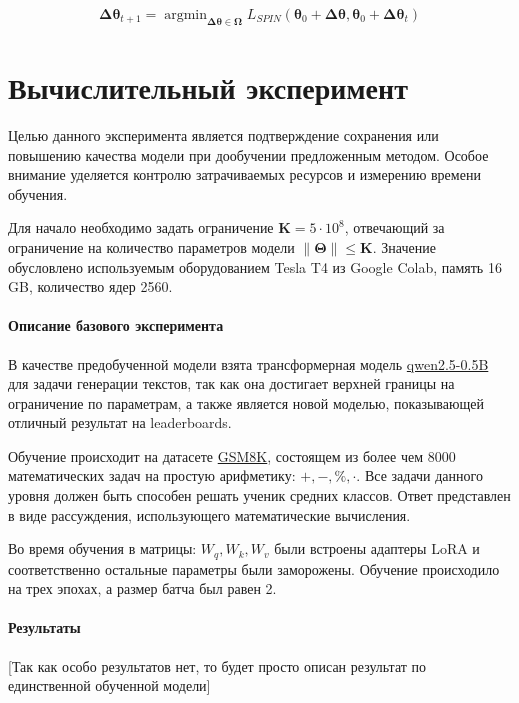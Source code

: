 \documentclass[12pt, twoside]{article}
\newcommand{\bOmega}{\boldsymbol{\Omega}}
\newcommand{\btheta}{\boldsymbol{\theta}}
\newcommand{\bTheta}{\boldsymbol{\Theta}}
\newcommand{\bDelta}{\boldsymbol{\Delta}}
\newcommand{\argmin}{\mathop{\mathrm{argmin}}}
\begin{document}
\begin{align}
    \bDelta\btheta_{t+1} = \argmin_{\bDelta\btheta \in \bOmega} L_{SPIN} (\btheta_0 + \bDelta\btheta, \btheta_0 + \bDelta \btheta_t)
\end{align}

\section{Вычислительный эксперимент}

Целью данного эксперимента является подтверждение сохранения или повышению качества модели при дообучении предложенным методом. Особое внимание уделяется контролю затрачиваемых ресурсов и измерению времени обучения.

Для начало необходимо задать ограничение $\mathbf{K} = 5\cdot10^8$, отвечающий за ограничение на количество параметров модели $\| \bTheta\| \le \mathbf{K}$. Значение обусловлено используемым оборудованием Tesla T4 из Google Colab, память 16 GB, количество ядер 2560. 

\paragraph{Описание базового эксперимента}
В качестве предобученной модели взята трансформерная модель \href{https://huggingface.co/Qwen/Qwen2.5-0.5B}{qwen2.5-0.5B} для задачи генерации текстов, так как она достигает верхней границы на ограничение по параметрам, а также является новой моделью, показывающей отличный результат на leaderboards.

Обучение происходит на датасете \href{https://huggingface.co/datasets/openai/gsm8k}{GSM8K}, состоящем из более чем 8000 математических задач на простую арифметику: $+, -, \%, \cdot$. Все задачи данного уровня должен быть способен решать ученик средних классов. Ответ представлен в виде рассуждения, использующего математические вычисления.

Во время обучения в матрицы:  $W_q, W_k, W_v$ были встроены адаптеры LoRA и соответственно остальные параметры были заморожены. Обучение происходило на трех эпохах, а размер батча был равен 2.

\paragraph{Результаты}

[Так как особо результатов нет, то будет просто описан результат по единственной обученной модели]
\end{document}
